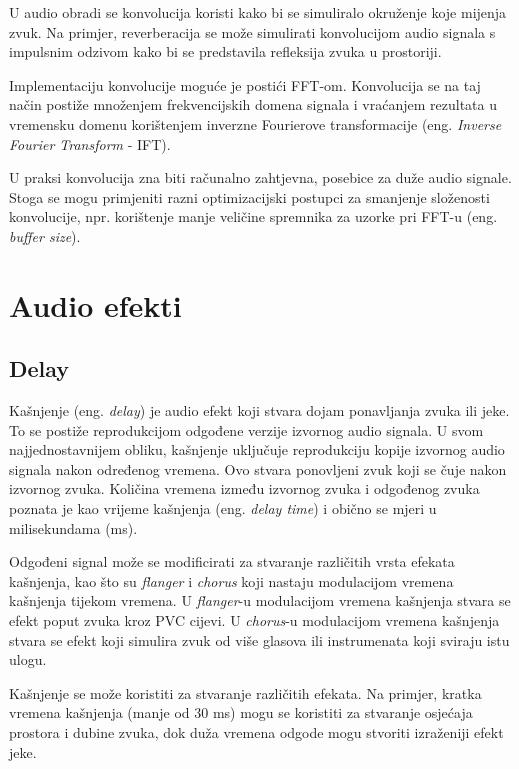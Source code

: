 \documentclass[times, utf8, seminar, numeric]{fer}
\begin{document}
U audio obradi se konvolucija koristi kako bi se simuliralo okruženje koje mijenja zvuk. Na primjer, reverberacija se može simulirati konvolucijom audio signala s impulsnim odzivom kako bi se predstavila refleksija zvuka u prostoriji.

Implementaciju konvolucije moguće je postići FFT-om. Konvolucija se na taj način postiže množenjem frekvencijskih domena signala i vraćanjem rezultata u vremensku domenu korištenjem inverzne Fourierove transformacije (eng. \textit{Inverse Fourier Transform} - IFT).

U praksi konvolucija zna biti računalno zahtjevna, posebice za duže audio signale. Stoga se mogu primjeniti razni optimizacijski postupci za smanjenje složenosti konvolucije, npr. korištenje manje veličine spremnika za uzorke pri FFT-u (eng. \textit{buffer size}).\cite{krishna2017digital}


\chapter{Audio efekti}

\section{Delay}

Kašnjenje (eng. \textit{delay}) je audio efekt koji stvara dojam ponavljanja zvuka ili jeke. To se postiže reprodukcijom odgođene verzije izvornog audio signala. U svom najjednostavnijem obliku, kašnjenje uključuje reprodukciju kopije izvornog audio signala nakon određenog vremena. Ovo stvara ponovljeni zvuk koji se čuje nakon izvornog zvuka. Količina vremena između izvornog zvuka i odgođenog zvuka poznata je kao vrijeme kašnjenja (eng. \textit{delay time}) i obično se mjeri u milisekundama (ms).\cite{zolzer2022digital}

Odgođeni signal može se modificirati za stvaranje različitih vrsta efekata kašnjenja, kao što su \textit{flanger} i \textit{chorus} koji nastaju modulacijom vremena kašnjenja tijekom vremena.
U \textit{flanger}-u modulacijom vremena kašnjenja stvara se efekt poput zvuka kroz PVC cijevi.  U \textit{chorus}-u modulacijom vremena kašnjenja stvara se efekt koji simulira zvuk od više glasova ili instrumenata koji sviraju istu ulogu.\cite{dattorro1997effect}

Kašnjenje se može koristiti za stvaranje različitih efekata. Na primjer, kratka vremena kašnjenja (manje od 30 ms) mogu se koristiti za stvaranje osjećaja prostora i dubine zvuka, dok duža vremena odgode mogu stvoriti izraženiji efekt jeke.
\end{document}
